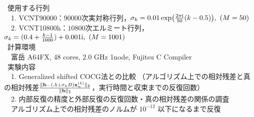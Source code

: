 

\textcolor{structure.fg}{\textbullet} \ 使用する行列\cite{ref-ELSES-matrix}\\
	　1. VCNT90000：$90000$次実対称行列，$\sigma_k = 0.01 \exp(\frac{2 \pi \i}{50}(k-0.5)),\ (M=50)$\\
	　2. VCNT10800h：$10800$次エルミート行列，$\sigma_k =(0.4+\frac{k-1}{1000}) + 0.001\i,\ (M=1001)$\\
\textcolor{structure.fg}{\textbullet} \ 計算環境\\
	　富岳 A64FX, 48 cores, 2.0 GHz 1node, Fujitsu C Compiler\\
\textcolor{structure.fg}{\textbullet} \ 実験内容\\
	　1. Generalized shifted COCG法との比較
	（アルゴリズム上での相対残差と真の相対残差$\frac{\|\vb{b}-(A+\sigma_{k}B)\vb{x}_{n}^{(k)}\|_2}{\|\vb{b}\|_2}$，実行時間と収束までの反復回数）\\
	　2. 内部反復の精度と外部反復の反復回数・真の相対残差の関係の調査\\
	　アルゴリズム上での相対残差のノルムが $10^{-12}$ 以下になるまで反復

%
%


\begin{comment}

\begin{itemize}
	\item 使用する行列\\
		1. VCNT90000：$90000$次実対称行列\\
		2. VCNT10800h：$10800$次エルミート行列
	\item 計算環境\\
		富岳 A64FX, 48 cores, 2.0 GHz 1node, Fujitsu C Compiler
	\item 実験内容\\
		1. Generalized shifted COCG法との比較（相対残差$\frac{\|\vb{b}-(A+\sigma_{k}B)\vb{x}_{n}^{(k)}\|_2}{\|\vb{b}\|_2}$，実行時間）\\
		2. 内部反復の精度と外部反復の反復回数・真の相対残差の関係の調査
\end{itemize}

\end{comment}

